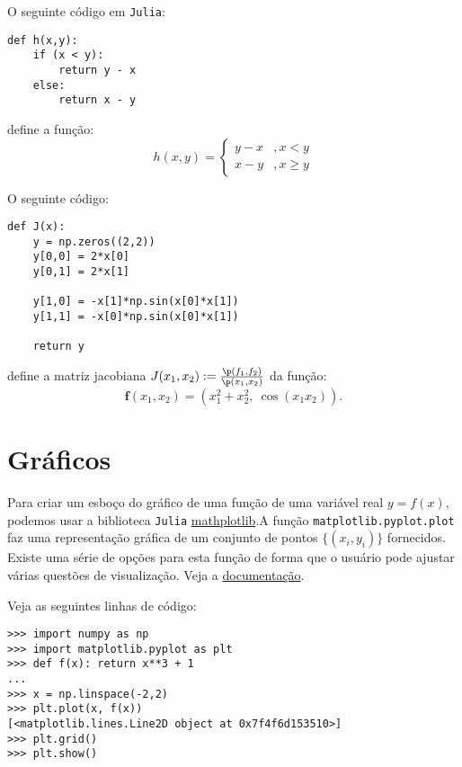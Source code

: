 \begin{ex}
  O seguinte código em \verb+Julia+:
\begin{lstlisting}
def h(x,y):
    if (x < y):
        return y - x
    else:
        return x - y
\end{lstlisting}
define a função:
\begin{equation}
  h(x,y) = \left\{
    \begin{array}{ll}
      y - x &, x < y\\
      x - y &, x \geq y
    \end{array}
\right.
\end{equation}
\end{ex}

\begin{ex}
  O seguinte código:
\begin{lstlisting}
def J(x):
    y = np.zeros((2,2))
    y[0,0] = 2*x[0]
    y[0,1] = 2*x[1]

    y[1,0] = -x[1]*np.sin(x[0]*x[1])
    y[1,1] = -x[0]*np.sin(x[0]*x[1])

    return y
\end{lstlisting}
define a matriz jacobiana $J(x_1,x_2) := \frac{\p(f_1,f_2)}{\p(x_1,x_2)}$ da função:
\begin{equation}
  \pmb{f}(x_1,x_2) = (x_1^2 + x_2^2,~\cos(x_1x_2)).
\end{equation}
\end{ex}

\section{Gráficos}

Para criar um esboço do gráfico de uma função de uma variável real $y = f(x)$, podemos usar a biblioteca \verb+Julia+ \href{https://matplotlib.org/}{mathplotlib}.A função \verb+matplotlib.pyplot.plot+ faz uma representação gráfica de um conjunto de pontos $\{(x_i, y_i)\}$ fornecidos. Existe uma série de opções para esta função de forma que o usuário pode ajustar várias questões de visualização. Veja a \href{https://matplotlib.org/api/pyplot_api.html?highlight=pyplot.plot#matplotlib.pyplot.plot}{documentação}.

\begin{ex}
  Veja as seguintes linhas de código:
\begin{lstlisting}
>>> import numpy as np
>>> import matplotlib.pyplot as plt
>>> def f(x): return x**3 + 1
...
>>> x = np.linspace(-2,2)
>>> plt.plot(x, f(x))
[<matplotlib.lines.Line2D object at 0x7f4f6d153510>]
>>> plt.grid()
>>> plt.show()
\end{lstlisting}
\end{ex}
